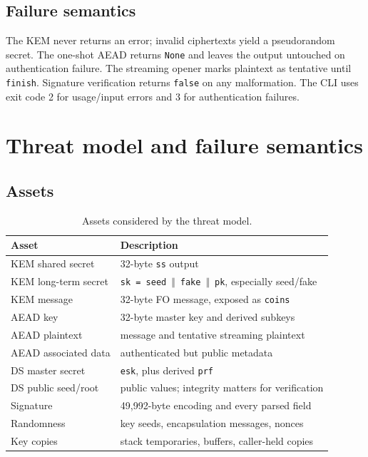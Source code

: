 \documentclass[runningheads]{llncs}
\newcommand{\concat}{\,\Vert\,}
\begin{document}
\subsection{Failure semantics}

The KEM never returns an error; invalid ciphertexts yield a
pseudorandom secret.  The one-shot AEAD returns \texttt{None} and leaves
the output untouched on authentication failure.  The streaming opener
marks plaintext as tentative until \texttt{finish}.  Signature
verification returns \texttt{false} on any malformation.  The CLI uses
exit code 2 for usage/input errors and 3 for authentication failures.


\section{Threat model and failure semantics}
\label{sec:threat}

\subsection{Assets}

\begin{table}[t]
\centering
\small
\begin{tabular}{@{}ll@{}}
\toprule
Asset & Description \\
\midrule
KEM shared secret & 32-byte \texttt{ss} output \\
KEM long-term secret & \texttt{sk = seed} $\concat$ \texttt{fake} $\concat$ \texttt{pk}, especially seed/fake \\
KEM message & 32-byte FO message, exposed as \texttt{coins} \\
AEAD key & 32-byte master key and derived subkeys \\
AEAD plaintext & message and tentative streaming plaintext \\
AEAD associated data & authenticated but public metadata \\
DS master secret & \texttt{esk}, plus derived \texttt{prf} \\
DS public seed/root & public values; integrity matters for verification \\
Signature & 49,992-byte encoding and every parsed field \\
Randomness & key seeds, encapsulation messages, nonces \\
Key copies & stack temporaries, buffers, caller-held copies \\
\bottomrule
\end{tabular}
\caption{Assets considered by the threat model.}
\label{tab:assets}
\end{table}
\end{document}
